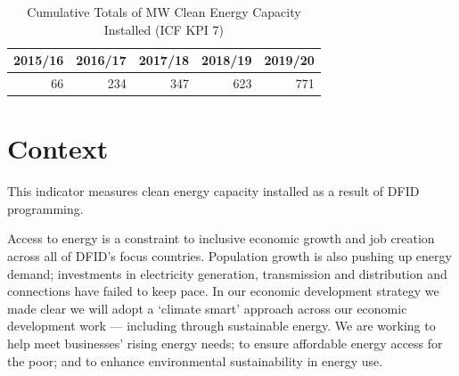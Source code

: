 \begin{table}[htbp]
	\centering
	\caption{Cumulative Totals of MW Clean Energy Capacity Installed (ICF KPI 7)}\label{tab:energy}
	\begin{tabular}{rrrrr}
		\toprule
		\multicolumn{1}{c}{\textbf{2015/16}}&\multicolumn{1}{c}{\textbf{2016/17}}&\multicolumn{1}{c}{\textbf{2017/18}}&\multicolumn{1}{c}{\textbf{2018/19}}&\multicolumn{1}{c}{\textbf{2019/20}} \\ \hline
		\rule{0pt}{10pt}66 	  &      234 	&        347 	   &     623 	  &        771 \\ \bottomrule
	\end{tabular}
\end{table}

\section{Context}

This indicator measures clean energy capacity installed as a result of DFID
programming. %

Access to energy is a constraint to inclusive economic growth and job creation across all of DFID's focus countries. %
Population growth is also pushing up energy demand; investments in electricity generation, transmission and distribution and connections have failed to keep pace. %
In our economic development strategy we made clear we will adopt a `climate smart' approach across our economic development work --- including through sustainable energy. %
We are working to help meet businesses' rising energy needs; to ensure affordable energy access for the poor; and to enhance environmental sustainability in energy use. %


\newpage
